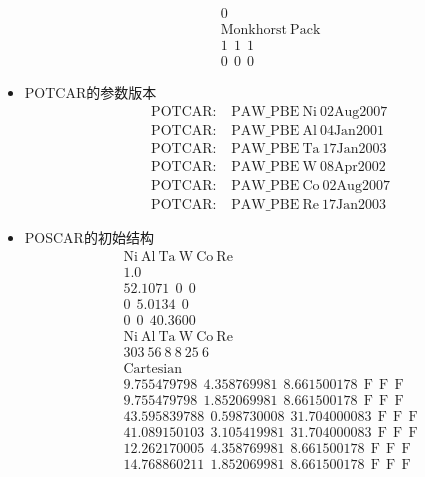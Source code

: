 \documentclass[10pt,a4paper]{article}
\begin{document}
\begin{itemize}
\begin{displaymath}
{\begin{aligned}
		&\mathrm{0}\\
		&\mathrm{Monkhorst~Pack}\\
		&\mathrm{ 1~~1~~1}\\
		&\mathrm{ 0~~0~~0}
	\end{aligned}
}
\end{displaymath}
	\item \textrm{POTCAR}的参数版本
		\begin{displaymath}
\boxed{
	\begin{aligned}
		&\mathrm{POTCAR:~~~~PAW\_PBE~Ni~02Aug2007} \\                 
	&\mathrm{POTCAR:~~~~PAW\_PBE~Al~04Jan2001} \\               
	&\mathrm{POTCAR:~~~~PAW\_PBE~Ta~17Jan2003} \\                
	&\mathrm{POTCAR:~~~~PAW\_PBE~W~08Apr2002}  \\                 
	 &\mathrm{POTCAR:~~~~PAW\_PBE~Co~02Aug2007} \\                 
	 &\mathrm{POTCAR:~~~~PAW\_PBE~Re~17Jan2003}                  
 \end{aligned}}
		\end{displaymath}
	\item \textrm{POSCAR}的初始结构
		\begin{displaymath}
			\boxed{
				\begin{aligned}
					&\mathrm{Ni~Al~Ta~W~Co~Re} \\
&1.0 \\
& 52.1071 ~ ~    0 ~ ~       0 \\
&  0 ~ ~     5.0134 ~ ~    0 \\
&  0 ~ ~        0   ~ ~   40.3600 \\ 
&\mathrm{Ni~Al~Ta~W~Co~Re} \\
&303~56~8~8~25~6 \\
&\mathrm{Cartesian} \\
& 9.755479798 ~~   4.358769981 ~~   8.661500178  ~~\mathrm{F  ~~ F  ~~  F} \\ 
& 9.755479798 ~~   1.852069981 ~~   8.661500178  ~~\mathrm{F  ~~ F  ~~  F} \\ 
&43.595839788 ~~   0.598730008 ~~  31.704000083  ~~\mathrm{F  ~~ F  ~~  F} \\ 
&41.089150103 ~~   3.105419981 ~~  31.704000083  ~~\mathrm{F  ~~ F  ~~  F} \\ 
&12.262170005 ~~   4.358769981 ~~   8.661500178  ~~\mathrm{F  ~~ F  ~~  F} \\ 
&14.768860211 ~~   1.852069981 ~~   8.661500178  ~~\mathrm{F  ~~ F  ~~  F} \\ 

\end{aligned}}
\end{displaymath}
\end{itemize}
\end{document}
